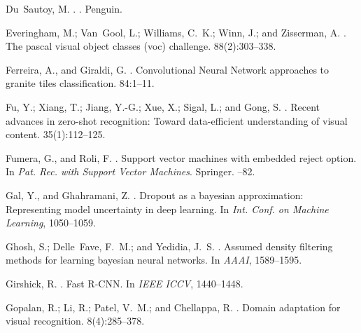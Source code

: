 \documentclass[letterpaper]{article}
\begin{document}
\begin{thebibliography}{}
Du~Sautoy, M.
.
.
\newblock Penguin.

Everingham, M.; Van~Gool, L.; Williams, C.~K.; Winn, J.; and Zisserman, A.
.
\newblock The pascal visual object classes (voc) challenge.
 88(2):303--338.

Ferreira, A., and Giraldi, G.
.
\newblock Convolutional {Neural} {Network} approaches to granite tiles
  classification.
 84:1--11.

Fu, Y.; Xiang, T.; Jiang, Y.-G.; Xue, X.; Sigal, L.; and Gong, S.
.
\newblock Recent advances in zero-shot recognition: {Toward} data-efficient
  understanding of visual content.
 35(1):112--125.


Fumera, G., and Roli, F.
.
\newblock Support vector machines with embedded reject option.
\newblock In {\em Pat. Rec. with Support Vector Machines}. Springer.
--82.

Gal, Y., and Ghahramani, Z.
.
\newblock Dropout as a bayesian approximation: Representing model uncertainty
  in deep learning.
\newblock In {\em Int. Conf. on Machine Learning},  1050--1059.

Ghosh, S.; Delle~Fave, F.~M.; and Yedidia, J.~S.
.
\newblock Assumed density filtering methods for learning bayesian neural
  networks.
\newblock In {\em AAAI},  1589--1595.

Girshick, R.
.
\newblock Fast {R-CNN}.
\newblock In {\em IEEE ICCV},  1440--1448.

Gopalan, R.; Li, R.; Patel, V.~M.; and Chellappa, R.
.
\newblock Domain adaptation for visual recognition.
  8(4):285--378.


\end{thebibliography}
\end{document}
